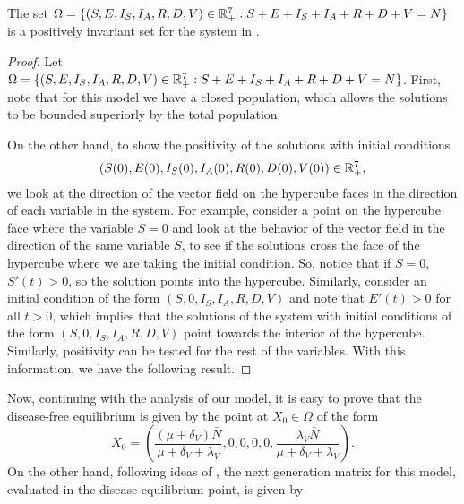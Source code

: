 \begin{lemma}
    The set  $\Omega=\{(S,E,I_S,I_A,R,D,V)\in \mathbb{R}^{7}_{+}:
    S+E+I_S+I_A+R+D+V=N\}$ is a positively invariant set for the system in
    .
\end{lemma}

\begin{proof}
    Let $\Omega=\{(S,E,I_S,I_A,R,D,V)\in \mathbb{R}^{7}_{+}: S+E+I_S+I_A+R+D+V=N\}$.
    First, note that for this model we have a closed population, which allows
    the solutions to be bounded superiorly by the total population.

    On the other hand, to show the positivity of the solutions with initial
    conditions $$(S (0), E (0), I_S (0), I_A (0), R (0), D (0), V (0)) \in
    \mathbb{R}^{7}_{+},$$ we look at the direction of the vector field on the hypercube
    faces in the direction of each variable in the system. For example,
    consider a point on the hypercube face where the variable $S = 0$ and look
    at the behavior of the vector field in the direction of the same variable
    $S$, to see if the solutions cross the face of the hypercube where we are
    taking the initial condition. So, notice that if $ S = 0 $, $ S '(t) > 0 $,
    so the solution points into the hypercube. Similarly, consider an initial
    condition of the form $ (S, 0, I_S, I_A, R, D, V) $ and note that $ E '(t)>
    0 $ for all $ t> 0 $, which implies that the solutions of the system with
    initial conditions of the form $  (S, 0, I_S, I_A, R, D, V)  $ point
    towards the interior of the hypercube. Similarly, positivity can be tested
    for the rest of the variables. With this information, we have the following
    result.
\end{proof}


Now, continuing with the analysis of our model, it is easy to prove that the
disease-free equilibrium is given by the point at $ X_0 \in \Omega $ of the form
$$
X_0 =\left(
\frac{(\mu+\delta_V)\bar{N}}{\mu+\delta_V+\lambda_V},
0, 0, 0, 0,
\frac{\lambda_V \bar{N}}{\mu+\delta_V+\lambda_V}
\right).
$$
On the other hand, following ideas of \cite{Van2002}, the next generation
matrix for this model, evaluated in the disease equilibrium point, is given by

